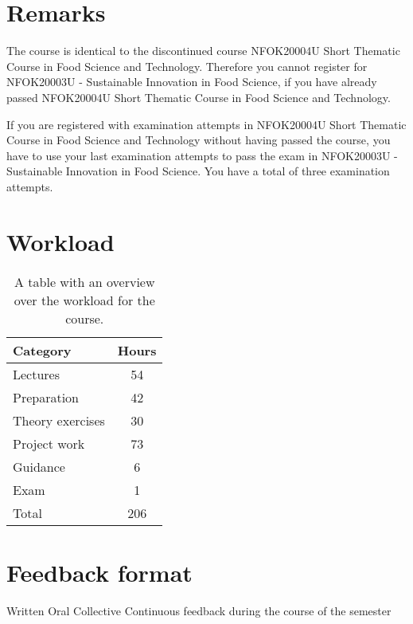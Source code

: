 \section*{Remarks}
The course is identical to the discontinued course NFOK20004U Short Thematic Course in Food Science and Technology. Therefore you cannot register for NFOK20003U - Sustainable Innovation in Food Science, if you have already passed NFOK20004U Short Thematic Course in Food Science and Technology.

If you are registered with examination attempts in NFOK20004U Short Thematic Course in Food Science and Technology without having passed the course, you have to use your last examination attempts to pass the exam in NFOK20003U - Sustainable Innovation in Food Science. You have a total of three examination attempts.


\section*{Workload}

\begin{table}[h]
    \centering
    \caption{A table with an overview over the workload for the course.}
    \label{tab:workload}
    \begin{tabular}{ l | c}
        \textbf{Category} & \textbf{Hours} \\ 
        \hline
        Lectures & 54 \\ 

        Preparation & 42 \\

        Theory exercises & 30 \\ 

        Project work & 73 \\

        Guidance & 6 \\

        Exam & 1 \\ 
        \hline
        Total & 206 \\ 
    \end{tabular}
\end{table}

\section*{Feedback format}
Written
Oral
Collective
Continuous feedback during the course of the semester

